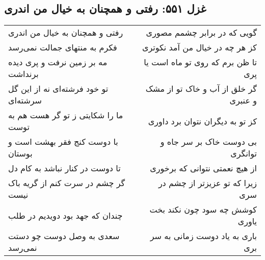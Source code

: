 \begin{center}
\section*{غزل ۵۵۱: رفتی و همچنان به خیال من اندری}
\label{sec:551}
\begin{longtable}{l p{0.5cm} r}
رفتی و همچنان به خیال من اندری
&&
گویی که در برابر چشمم مصوری
\\
فکرم به منتهای جمالت نمی‌رسد
&&
کز هر چه در خیال من آمد نکوتری
\\
مه بر زمین نرفت و پری دیده برنداشت
&&
تا ظن برم که روی تو ماه است یا پری
\\
تو خود فرشته‌ای نه از این گل سرشته‌ای
&&
گر خلق از آب و خاک تو از مشک و عنبری
\\
ما را شکایتی ز تو گر هست هم به توست
&&
کز تو به دیگران نتوان برد داوری
\\
با دوست کنج فقر بهشت است و بوستان
&&
بی دوست خاک بر سر جاه و توانگری
\\
تا دوست در کنار نباشد به کام دل
&&
از هیچ نعمتی نتوانی که برخوری
\\
گر چشم در سرت کنم از گریه باک نیست
&&
زیرا که تو عزیزتر از چشم در سری
\\
چندان که جهد بود دویدیم در طلب
&&
کوشش چه سود چون نکند بخت یاوری
\\
سعدی به وصل دوست چو دستت نمی‌رسد
&&
باری به یاد دوست زمانی به سر بری
\\
\end{longtable}
\end{center}
